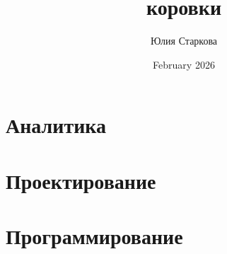

\title{коровки}
\author{Юлия Старкова}
\date{February 2026}



%

\newpage

\newpage
\tableofcontents
    
\newpage

\newpage

\newpage
\section{Аналитика}

\newpage
\section{Проектирование}

\newpage



\newpage
\section{Программирование}


\newpage

\newpage

\newpage

\newpage

\newpage


